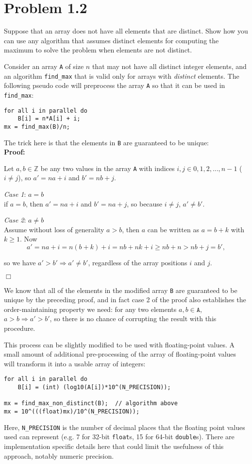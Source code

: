 \section*{Problem 1.2}
Suppose that an array does not have all elements that are distinct. Show how you can use
any algorithm that assumes distinct elements for computing the maximum to solve the problem when
elements are not distinct.
\probline

Consider an array \texttt{A} of size $n$ that may not have all distinct integer elements, and an algorithm \texttt{find\_max} that is valid only for arrays with \textit{distinct} elements. The following pseudo code will preprocess the array \texttt{A} so that it can be used in \texttt{find\_max}:
\begin{lstlisting}
for all i in parallel do
	B[i] = n*A[i] + i;
mx = find_max(B)/n;
\end{lstlisting}

The trick here is that the elements in \texttt{B} are guaranteed to be unique:
\\
\textbf{Proof:}

Let $a,b \in \mathbb{Z}$ be any two values in the array \texttt{A} with indices $i,j \in 0,1,2,...,n-1$ ($i\neq j$), so $a' = na+i$ and $b' = nb+j$.

\textit{Case 1}: $a = b$\\
if $a = b$, then $a' = na+i$ and $b' = na+j$, so because $i\neq j$, $a'\neq b'$.

\textit{Case 2}: $a \neq b$\\
Assume without loss of generality $a>b$, then $a$ can be written as $a = b+k$ with $k \geq 1$. Now
\[
a' = na + i = n(b+k) + i = nb + nk + i \geq nb + n > nb + j = b',
\]

so we have $a'>b' \Rightarrow a' \neq b'$, regardless of the array positions $i$ and $j$.
\begin{flushright}
$\Box$
\end{flushright}

We know that all of the elements in the modified array \texttt{B} are guaranteed to be unique by the preceding proof, and in fact case 2 of the proof also establishes the order-maintaining property we need: for any two elements $a,b \in \texttt{A}$, $a>b \Rightarrow a'>b'$, so there is no chance of corrupting the result with this procedure.

\pagebreak

This process can be slightly modified to be used with floating-point values. A small amount of additional pre-processing of the array of floating-point values will transform it into a usable array of integers:
\begin{lstlisting}
for all i in parallel do
	B[i] = (int) (log10(A[i])*10^(N_PRECISION));

mx = find_max_non_distinct(B);	// algorithm above
mx = 10^(((float)mx)/10^(N_PRECISION));
\end{lstlisting}

Here, \texttt{N\_PRECISION} is the number of decimal places that the floating point values used can represent (e.g. 7 for 32-bit \texttt{float}s, 15 for 64-bit \texttt{double}s). There are implementation specific details here that could limit the usefulness of this approach, notably numeric precision.
